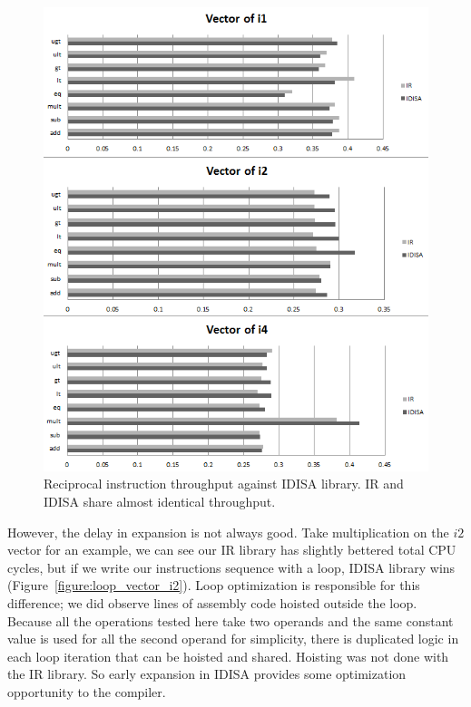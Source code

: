 \begin{figure}[htbp!]
\centering
\includegraphics[width=140mm]{draw/reciprocal_throughput_vector.png}
\caption[Reciprocal instruction throughput against IDISA library]{Reciprocal instruction throughput against IDISA library. IR and IDISA share almost identical throughput.}
\label{figure:throughput_vector}
\end{figure}

However, the delay in expansion is not always good. Take multiplication on the $i2$ vector for an example, we can see our IR library has slightly bettered total CPU cycles, but if we write our instructions sequence with a loop, IDISA library wins (Figure~\ref{figure:loop_vector_i2}). Loop optimization is responsible for this difference; we did observe lines of assembly code hoisted outside the loop. Because all the operations tested here take two operands and the same constant value is used for all the second operand for simplicity, there is duplicated logic in each loop iteration that can be hoisted and shared. Hoisting was not done with the IR library. So early expansion in IDISA provides some optimization opportunity to the compiler.

